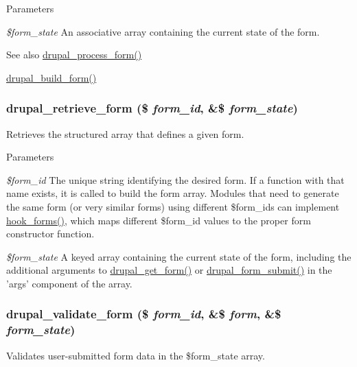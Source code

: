 \begin{DoxyParams}{Parameters}
\item[{\em \$form\_\-state}]An associative array containing the current state of the form.\end{DoxyParams}
\begin{DoxySeeAlso}{See also}
\hyperlink{group__form__api_ga61186f5c43533761544a778918818fd2}{drupal\_\-process\_\-form()} 

\hyperlink{group__form__api_gabead4b3c089fd605421d371a0315c4d7}{drupal\_\-build\_\-form()} 
\end{DoxySeeAlso}
\hypertarget{group__form__api_ga82f16e1c86833aa88bf93adf93bae9bb}{
\subsubsection[{drupal\_\-retrieve\_\-form}]{\setlength{\rightskip}{0pt plus 5cm}drupal\_\-retrieve\_\-form (\$ {\em form\_\-id}, \/  \&\$ {\em form\_\-state})}}
\label{group__form__api_ga82f16e1c86833aa88bf93adf93bae9bb}
Retrieves the structured array that defines a given form.


\begin{DoxyParams}{Parameters}
\item[{\em \$form\_\-id}]The unique string identifying the desired form. If a function with that name exists, it is called to build the form array. Modules that need to generate the same form (or very similar forms) using different \$form\_\-ids can implement \hyperlink{group__hooks_gaa764fee74b85797f75c0c923cad628d5}{hook\_\-forms()}, which maps different \$form\_\-id values to the proper form constructor function. \item[{\em \$form\_\-state}]A keyed array containing the current state of the form, including the additional arguments to \hyperlink{group__form__api_ga720df81a837b06dfe19daf1c1eea3437}{drupal\_\-get\_\-form()} or \hyperlink{group__form__api_ga4312d7fe0602f6359153fc62cba1ca24}{drupal\_\-form\_\-submit()} in the 'args' component of the array. \end{DoxyParams}
\hypertarget{group__form__api_ga05a4aea7c6aa28db24a5f96da6948f34}{
\subsubsection[{drupal\_\-validate\_\-form}]{\setlength{\rightskip}{0pt plus 5cm}drupal\_\-validate\_\-form (\$ {\em form\_\-id}, \/  \&\$ {\em form}, \/  \&\$ {\em form\_\-state})}}
\label{group__form__api_ga05a4aea7c6aa28db24a5f96da6948f34}
Validates user-\/submitted form data in the \$form\_\-state array.


